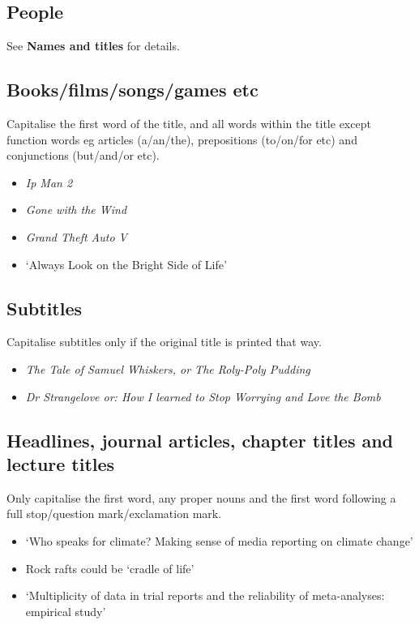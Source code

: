 \documentclass[11pt,a4paper]{book}
\newcommand{\cmark}{{\color{green(html/cssgreen)}\checkmark}}%
\begin{document}
				\subsection{People}
				See \textbf{Names and titles} for details.
				\subsection{Books/films/songs/games etc}
				Capitalise the first word of the title, and all words within the title except function words eg articles (a/an/the), prepositions (to/on/for etc) and conjunctions (but/and/or etc). 
					{\firasans \begin{mdframed}[backgroundcolor=aliceblue] \begin{itemize}[label=\cmark]
						\item \textit{Ip Man 2}
						\item \textit{Gone with the Wind}
						\item \textit{Grand Theft Auto V}
						\item `Always Look on the Bright Side of Life'
					\end{itemize} \end{mdframed} }
				\newpage
				\subsection{Subtitles}
				Capitalise subtitles only if the original title is printed that way.
					{\firasans \begin{mdframed}[backgroundcolor=aliceblue] \begin{itemize}[label=\cmark]
						\item \textit{The Tale of Samuel Whiskers, or The Roly-Poly Pudding}
						\item \textit{Dr Strangelove or: How I learned to Stop Worrying and Love the Bomb}
					\end{itemize} \end{mdframed} }
				\subsection{Headlines, journal articles, chapter titles and lecture titles}
				Only capitalise the first word, any proper nouns and the first word following a full stop/question mark/exclamation mark.
					{\firasans \begin{mdframed}[backgroundcolor=aliceblue] \begin{itemize}[label=\cmark]
						\item `Who speaks for climate? Making sense of media reporting on climate change'
						\item Rock rafts could be `cradle of life'
						\item `Multiplicity of data in trial reports and the reliability of meta-analyses: empirical study'
					\end{itemize} \end{mdframed} }
\end{document}
